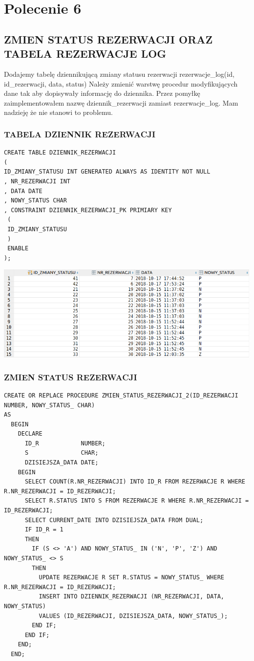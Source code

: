 \newpage
\section{Polecenie 6}

\subsection{ZMIEN STATUS REZERWACJI ORAZ TABELA REZERWACJE LOG}
Dodajemy tabelę dziennikującą zmiany statusu rezerwacji
rezerwacje\_log(id, id\_rezerwacji, data, status)
Należy zmienić warstwę procedur modyfikujących dane tak aby dopisywały informację do
dziennika. Przez pomyłkę zaimplementowałem nazwę dziennik\_rezerwacji zamiast rezerwacje\_log. 
Mam nadzieję że nie stanowi to problemu.

\subsubsection{TABELA DZIENNIK REZERWACJI}
\begin{verbatim}
CREATE TABLE DZIENNIK_REZERWACJI
(
ID_ZMIANY_STATUSU INT GENERATED ALWAYS AS IDENTITY NOT NULL
, NR_REZERWACJI INT
, DATA DATE
, NOWY_STATUS CHAR
, CONSTRAINT DZIENNIK_REZERWACJI_PK PRIMIARY KEY
 (
 ID_ZMIANY_STATUSU
 )
 ENABLE
);
\end{verbatim}

\includegraphics[width=\linewidth]{./images/tabela_dziennik_rezerwacji.png}

\subsubsection{ZMIEN STATUS REZERWACJI}
\begin{verbatim}
CREATE OR REPLACE PROCEDURE ZMIEN_STATUS_REZERWACJI_2(ID_REZERWACJI NUMBER, NOWY_STATUS_ CHAR)
AS
  BEGIN
    DECLARE
      ID_R            NUMBER;
      S               CHAR;
      DZISIEJSZA_DATA DATE;
    BEGIN
      SELECT COUNT(R.NR_REZERWACJI) INTO ID_R FROM REZERWACJE R WHERE R.NR_REZERWACJI = ID_REZERWACJI;
      SELECT R.STATUS INTO S FROM REZERWACJE R WHERE R.NR_REZERWACJI = ID_REZERWACJI;
      SELECT CURRENT_DATE INTO DZISIEJSZA_DATA FROM DUAL;
      IF ID_R = 1
      THEN
        IF (S <> 'A') AND NOWY_STATUS_ IN ('N', 'P', 'Z') AND NOWY_STATUS_ <> S
        THEN
          UPDATE REZERWACJE R SET R.STATUS = NOWY_STATUS_ WHERE R.NR_REZERWACJI = ID_REZERWACJI;
          INSERT INTO DZIENNIK_REZERWACJI (NR_REZERWACJI, DATA, NOWY_STATUS)
          VALUES (ID_REZERWACJI, DZISIEJSZA_DATA, NOWY_STATUS_);
        END IF;
      END IF;
    END;
  END;
\end{verbatim}

